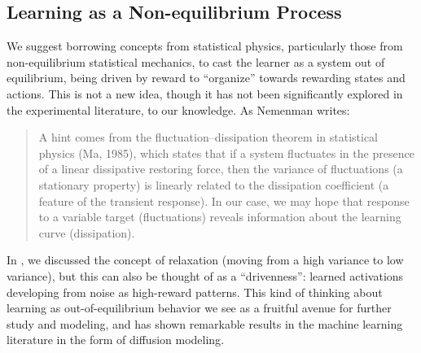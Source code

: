 \documentclass[../main.tex]{subfiles}
\begin{document}
\subsection{Learning as a Non-equilibrium Process}

We suggest borrowing concepts from statistical physics, particularly those from non-equilibrium statistical mechanics, to cast the learner as a system out of equilibrium, being driven by reward to ``organize'' towards rewarding states and actions. This is not a new idea, though it has not been significantly explored in the experimental literature, to our knowledge. As Nemenman writes:
%
\begin{quote}
    A hint comes from the fluctuation–dissipation theorem in statistical physics (Ma, 1985), which states that if a system fluctuates in the presence of a linear dissipative restoring force, then the variance of fluctuations (a stationary property) is linearly related to the dissipation coefficient (a feature of the transient response). In our case, we may hope that response to a variable target (fluctuations) reveals information about the learning curve (dissipation)\cite{nemenmanFluctuationDissipationTheoremModels2005}.
\end{quote}
%
In , we discussed the concept of relaxation (moving from a high variance to low variance), but this can also be thought of as a ``drivenness'': learned activations developing from noise as high-reward patterns. This kind of thinking about learning as out-of-equilibrium behavior we see as a fruitful avenue for further study and modeling, and has shown remarkable results in the machine learning literature in the form of diffusion modeling\cite{sohl-dicksteinDeepUnsupervisedLearning2015}.






\end{document}
